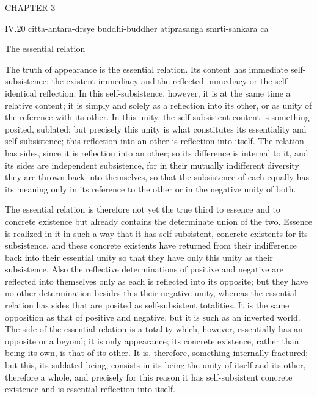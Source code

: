 CHAPTER 3

IV.20
citta-antara-drsye buddhi-buddher atiprasanga smrti-sankara ca

The essential relation

The truth of appearance is the essential relation.
Its content has immediate self-subsistence:
the existent immediacy and the reflected immediacy
or the self-identical reflection.
In this self-subsistence, however,
it is at the same time a relative content;
it is simply and solely as a reflection into its other,
or as unity of the reference with its other.
In this unity, the self-subsistent content is something posited, sublated;
but precisely this unity is what constitutes
its essentiality and self-subsistence;
this reflection into an other is reflection into itself.
The relation has sides, since it is reflection into an other;
so its difference is internal to it,
and its sides are independent subsistence,
for in their mutually indifferent diversity
they are thrown back into themselves,
so that the subsistence of each equally has its meaning
only in its reference to the other or in the negative unity of both.

The essential relation is therefore not yet the true third
to essence and to concrete existence
but already contains the determinate union of the two.
Essence is realized in it in such a way that it has
self-subsistent, concrete existents for its subsistence,
and these concrete existents have returned
from their indifference back into their essential unity
so that they have only this unity as their subsistence.
Also the reflective determinations of positive and negative are
reflected into themselves only as each is reflected into its opposite;
but they have no other determination besides this their negative unity,
whereas the essential relation has sides
that are posited as self-subsistent totalities.
It is the same opposition as that of positive and negative,
but it is such as an inverted world.
The side of the essential relation is a totality
which, however, essentially has an opposite or a beyond;
it is only appearance; its concrete existence,
rather than being its own, is that of its other.
It is, therefore, something internally fractured;
but this, its sublated being, consists in its being
the unity of itself and its other,
therefore a whole, and precisely for this reason
it has self-subsistent concrete existence
and is essential reflection into itself.

